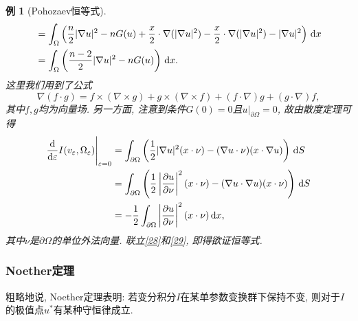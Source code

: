 \documentclass[12pt,a4paper]{article}
\newtheorem{example}[theorem]{例}
\begin{document}
\begin{example}[Pohozaev恒等式]
\begin{equation}
\begin{aligned}
            &= \int_{\Omega}\left(\frac{n}{2}|\nabla u|^2 - nG(u) + \frac{x}{2} \cdot \nabla (|\nabla u|^2) - \frac{x}{2} \cdot \nabla (|\nabla u|^2) - |\nabla u|^2\right) \,{\rm d}x \\  
            &= \int_{\Omega}\left(\frac{n - 2}{2}|\nabla u|^2 - nG(u)\right) \,{\rm d}x.
        \end{aligned}
    \end{equation}
    这里我们用到了公式
    \begin{equation*}
        \nabla (f \cdot g) = f \times (\nabla \times g) + g \times (\nabla \times f) + (f \cdot \nabla)g + (g \cdot \nabla)f, 
    \end{equation*}
    其中$f, g$均为向量场. 另一方面, 注意到条件$G(0) = 0$且$u|_{\partial\Omega} = 0$, 故由散度定理可得 
    \begin{equation}\label{29}
        \begin{aligned}
            \frac{{\rm d}}{{\rm d}\varepsilon}I(v_{\varepsilon},\Omega_{\varepsilon})\Bigg|_{\varepsilon = 0} &= \int_{\partial\Omega}\left(\frac{1}{2}|\nabla u|^2(x \cdot \nu) - (\nabla u \cdot \nu)(x \cdot \nabla u)\right) \,{\rm d}S \\  
            &= \int_{\partial\Omega}\left(\frac{1}{2}\left|\frac{\partial u}{\partial\nu}\right|^2(x \cdot \nu) - (\nabla u \cdot \nabla u)(x \cdot \nu)\right) \,{\rm d}S \\ 
            &= -\frac{1}{2}\int_{\partial\Omega}\left|\frac{\partial u}{\partial\nu}\right|^2(x \cdot \nu) \,{\rm d}x,
        \end{aligned}
    \end{equation}
    其中$\nu$是$\partial\Omega$的单位外法向量. 联立\eqref{28}和\eqref{29}, 即得欲证恒等式.
\end{example}

\subsubsection{Noether定理}

粗略地说, Noether定理表明: 若变分积分$I$在某单参数变换群下保持不变, 则对于$I$的极值点$u^*$有某种守恒律成立.
\end{document}
